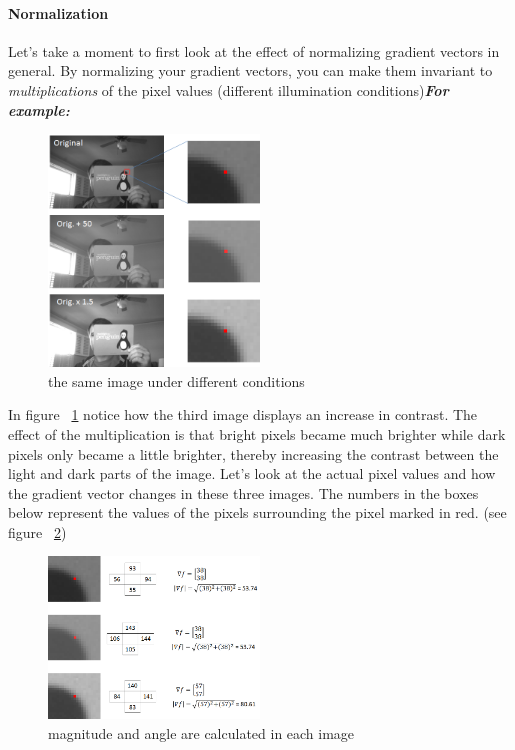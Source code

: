 \paragraph{Normalization}
Let’s take a moment to first look at the effect of normalizing gradient vectors in general.
By normalizing your gradient vectors, you can make them invariant to \textit{multiplications} of the pixel values (different illumination conditions)\newline \newline \textbf{\textit{For example:}} \newline
\begin{figure}
	\centering
	\includegraphics[width=0.5\textwidth]{images/normalization_ex.png}
	\caption{the same image under different conditions}
	\label{fig:normalization}
\end{figure}
In figure ~\ref{fig:normalization} notice how the third image displays an increase in contrast. \newline
The effect of the multiplication is that bright pixels became much brighter while dark pixels only became a little brighter, thereby increasing the contrast between the light and dark parts of the image. 
\newline \newline Let’s look at the actual pixel values and how the gradient vector changes in these three images. \newline The numbers in the boxes below represent the values of the pixels surrounding the pixel marked in red. (see figure ~\ref{fig:normalization calc})
\begin{figure}
	\centering
	\includegraphics[width=0.5\textwidth]{images/normalization_calc.png}
	\caption{magnitude and angle are calculated in each image}
	\label{fig:normalization calc}
\end{figure}
